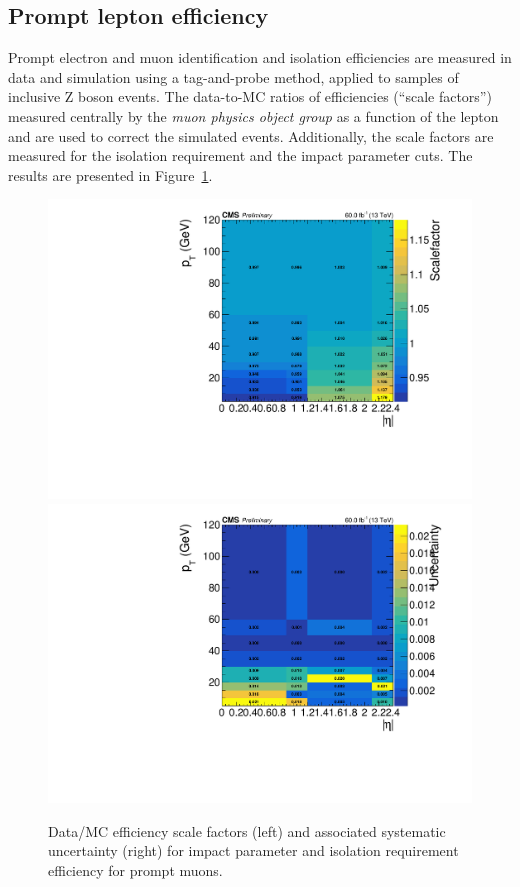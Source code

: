 \subsection{Prompt lepton efficiency} \label{sec:promptleptoneff}
Prompt electron and muon identification and isolation efficiencies
are measured in data and simulation using a tag-and-probe method,
applied to samples of inclusive Z boson events.
The data-to-MC ratios of efficiencies (``scale factors'')
measured centrally by the \emph{muon physics object group} as a
function of the lepton \pt and \sigeta are
used to correct the simulated events. Additionally, the scale factors
are measured for the isolation requirement and the impact
parameter cuts. The results are presented in
Figure~\ref{fig:isoip_muon_prompt}.
\begin{figure}[h]
\centering
  \includegraphics[width=.45\textwidth]{Figures/c6/efficiencies/muons/2018/isoip_prompt_sf_2018.pdf}
  \includegraphics[width=.45\textwidth]{Figures/c6/efficiencies/muons/2018/isoip_prompt_syst_2018.pdf}
  \caption{Data/MC efficiency scale factors (left) and associated
  systematic uncertainty (right) for impact parameter and isolation requirement efficiency
  for prompt muons. \kirill}
  \label{fig:isoip_muon_prompt}
\end{figure}

